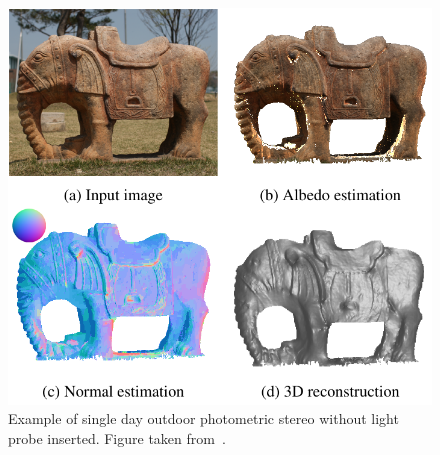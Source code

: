 






\begin{figure}
\centering
\includegraphics[width=0.50\linewidth]{3rdparty/jung-summary.png}
\caption[State-of-the-art semi-calibrated photometric stereo]{Example of single day outdoor photometric stereo without light probe inserted. Figure taken from~\cite{jung-cvpr-15}.}
\label{fig:jung_summary}
\end{figure}


